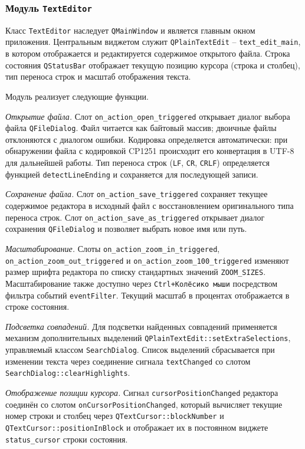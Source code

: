 \subsubsection{Модуль \texttt{TextEditor}}

Класс \verb`TextEditor` наследует \verb`QMainWindow` и является главным окном приложения. Центральным виджетом служит \verb`QPlainTextEdit` -- \verb`text_edit_main`, в котором отображается и редактируется содержимое открытого файла. Строка состояния \verb`QStatusBar` отображает текущую позицию курсора (строка и столбец), тип переноса строк и масштаб отображения текста.

Модуль реализует следующие функции.

\textit{Открытие файла.} Слот \verb`on_action_open_triggered` открывает диалог выбора файла \verb`QFileDialog`. Файл читается как байтовый массив; двоичные файлы отклоняются с диалогом ошибки. Кодировка определяется автоматически: при обнаружении файла с кодировкой CP1251 происходит его конвертация в UTF-8 для дальнейшей работы. Тип переноса строк (\verb`LF`, \verb`CR`, \verb`CRLF`) определяется функцией \verb`detectLineEnding` и сохраняется для последующей записи.

\textit{Сохранение файла.} Слот \verb`on_action_save_triggered` сохраняет текущее содержимое редактора в исходный файл с восстановлением оригинального типа переноса строк. Слот \verb`on_action_save_as_triggered` открывает диалог сохранения \verb`QFileDialog` и позволяет выбрать новое имя или путь.

\textit{Масштабирование.} Слоты \verb`on_action_zoom_in_triggered`, \verb`on_action_zoom_out_triggered` и \verb`on_action_zoom_100_triggered` изменяют размер шрифта редактора по списку стандартных значений \verb`ZOOM_SIZES`. Масштабирование также доступно через \verb`Ctrl+Колёсико мыши` посредством фильтра событий \verb`eventFilter`. Текущий масштаб в процентах отображается в строке состояния.

\textit{Подсветка совпадений.} Для подсветки найденных совпадений применяется механизм дополнительных выделений \verb`QPlainTextEdit::setExtraSelections`, управляемый классом \verb`SearchDialog`. Список выделений сбрасывается при изменении текста через соединение сигнала \verb`textChanged` со слотом \verb`SearchDialog::clearHighlights`.

\textit{Отображение позиции курсора.} Сигнал \verb`cursorPositionChanged` редактора соединён со слотом \verb`onCursorPositionChanged`, который вычисляет текущие номер строки и столбец через \verb`QTextCursor::blockNumber` и \verb`QTextCursor::positionInBlock` и отображает их в постоянном виджете \verb`status_cursor` строки состояния.

